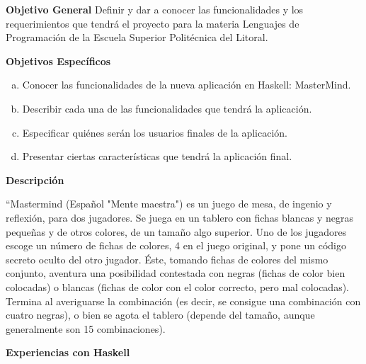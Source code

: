 \documentclass[12pt]{report}
\begin{document}
	\begingroup
		\large{
			\textbf{
				Objetivo General
				\newline
				\newline
			}
		}
	\endgroup
	Definir y dar a conocer las funcionalidades y los requerimientos que tendrá el proyecto para la materia Lenguajes de 				
	Programación de la Escuela Superior Politécnica del Litoral. 

	\vspace{4em}
	\begingroup
		\large{
			\textbf{
				Objetivos Específicos
				\newline
			}
		}
	\endgroup
		\begin{enumerate}[(a)]%
		\item Conocer las funcionalidades de la nueva aplicación en Haskell: MasterMind.
		\item Describir cada una de las funcionalidades que tendrá la aplicación.
		\item Especificar quiénes serán los usuarios finales de la aplicación.
		\item Presentar ciertas características que tendrá la aplicación final.

		\end{enumerate}

	\begingroup
		\large{
			\textbf{\newline
				\newline
				Descripción
				\newline
				\newline
			}
		}
	\endgroup


``Mastermind (Español "Mente maestra") es un juego de mesa, de ingenio y reflexión, para dos jugadores.
Se juega en un tablero con fichas blancas y negras pequeñas y de otros colores, de un tamaño algo superior. Uno de los jugadores escoge un número de fichas de colores, 4 en el juego original, y pone un código secreto oculto del otro jugador. Éste, tomando fichas de colores del mismo conjunto, aventura una posibilidad contestada con negras (fichas de color bien colocadas) o blancas (fichas de color con el color correcto, pero mal colocadas).
Termina al averiguarse la combinación (es decir, se consigue una combinación con cuatro negras), o bien se agota el tablero (depende del tamaño, aunque generalmente son 15 combinaciones).

	\begingroup
		\large{
			\textbf{\newline
				\newline
				Experiencias con Haskell
				\newline
				\newline
			}
		}
	\endgroup
\end{document}

